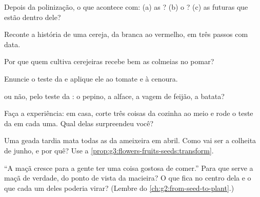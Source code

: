 \begin{exercise}[$\star$]\label{exo:g3:flowers-fruits-seeds:3}
Depois da polinização, o que acontece com: (a) as ? (b) o
? (c) as futuras  que estão dentro dele?
\end{exercise}

\begin{exercise}[$\star$]\label{exo:g3:flowers-fruits-seeds:4}
Reconte a história de uma cereja, da  branca ao  vermelho,
em três passos com data.
\end{exercise}

\begin{exercise}[$\star$]\label{exo:g3:flowers-fruits-seeds:5}
Por que quem cultiva cerejeiras recebe bem as colmeias no pomar?
\end{exercise}

\begin{exercise}[$\star$]\label{exo:g3:flowers-fruits-seeds:6}
Enuncie o teste da  e aplique ele ao tomate e à cenoura.
\end{exercise}

\begin{exercise}[$\star$]\label{exo:g3:flowers-fruits-seeds:7}
 ou não, pelo teste da : o pepino, a alface, a vagem de
feijão, a batata?
\end{exercise}

\begin{exercise}[$\star$]\label{exo:g3:flowers-fruits-seeds:8}
Faça a experiência: em casa, corte três coisas da cozinha ao meio e
rode o teste da  em cada uma. Qual delas surpreendeu você?
\end{exercise}

\begin{exercise}[$\star\star$]\label{exo:g3:flowers-fruits-seeds:9}
Uma geada tardia mata todas as  da ameixeira em abril. Como
vai ser a colheita de junho, e por quê? Use a
\cref{prop:g3:flowers-fruits-seeds:transform}.
\end{exercise}

\begin{exercise}[$\star\star$]\label{exo:g3:flowers-fruits-seeds:10}
``A maçã cresce para a gente ter uma coisa gostosa de comer.'' Para
que serve a maçã de verdade, do ponto de vista da macieira? O que
fica no centro dela e o que cada um deles poderia virar? (Lembre do
\cref{ch:g2:from-seed-to-plant}.)
\end{exercise}
